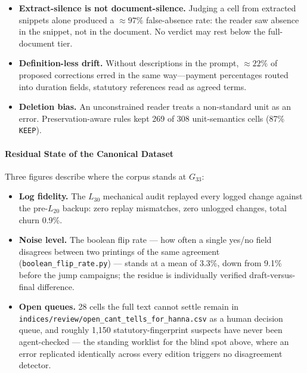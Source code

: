 \begin{itemize}[leftmargin=1.5em]
  \item \textbf{Extract-silence is not document-silence.} Judging a cell from extracted snippets alone produced a $\approx 97\%$ false-absence rate: the reader saw absence in the snippet, not in the document. No verdict may rest below the full-document tier.
  \item \textbf{Definition-less drift.} Without descriptions in the prompt, $\approx 22\%$ of proposed corrections erred in the same way---payment percentages routed into duration fields, statutory references read as agreed terms.
  \item \textbf{Deletion bias.} An unconstrained reader treats a non-standard unit as an error. Preservation-aware rules kept 269 of 308 unit-semantics cells (87\% \texttt{KEEP}).
\end{itemize}

\paragraph{Residual State of the Canonical Dataset}
Three figures describe where the corpus stands at $G_{33}$:
\begin{itemize}[leftmargin=1.5em]
  \item \textbf{Log fidelity.} The $L_{30}$ mechanical audit replayed every logged change against the pre-$L_{20}$ backup: zero replay mismatches, zero unlogged changes, total churn 0.9\%.
  \item \textbf{Noise level.} The boolean flip rate --- how often a single yes/no field disagrees between two printings of the same agreement (\nolinkurl{boolean_flip_rate.py}) --- stands at a mean of 3.3\%, down from 9.1\% before the jump campaigns; the residue is individually verified draft-versus-final difference.
  \item \textbf{Open queues.} 28 cells the full text cannot settle remain in \nolinkurl{indices/review/open_cant_tells_for_hanna.csv} as a human decision queue, and roughly 1,150 statutory-fingerprint suspects have never been agent-checked --- the standing worklist for the blind spot above, where an error replicated identically across every edition triggers no disagreement detector.
\end{itemize}
